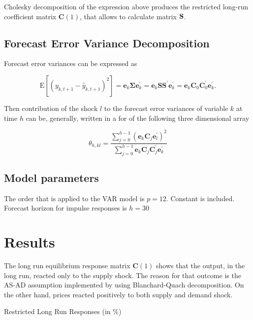 \documentclass[a4paper,12pt]{article}
\begin{document}
Cholesky decomposition of the expression above produces the restricted long-run coefficient matrix \(\mathbf{C}(1)\), that allows to calculate matrix \(\bf S\).

\subsection{Forecast Error Variance Decomposition}

Forecast error variances can be expressed as

\begin{equation} \label{eq:9}
		\mathrm{E}\left[\left(y_{k, t+1}-\hat{y}_{k, t+1}\right)^{2}\right]=\mathbf{e}_{k} \mathbf{\Sigma} \mathbf{e}_{k}^{\prime}=\mathbf{e}_{k} \mathbf{S S}^{\prime} \mathbf{e}_{k}^{\prime}=\mathbf{e}_{k} \mathbf{C}_{0} \mathbf{C}_{0}^{\prime} \mathbf{e}_{k}^{\prime}.
\end{equation}

Then contribution of the shock \(l\) to the forecast error variances of variable \(k\) at time \(h\) can be, generally, written in a for of the following three dimensional array

\begin{equation} \label{eq:10}
		\theta_{h, k l}=\frac{\sum_{j=0}^{h-1}\left(\mathbf{e}_{k} \mathbf{C}_{j} \mathbf{e}_{l}^{\prime}\right)^{2}}{\sum_{j=0}^{h-1} \mathbf{e}_{k} \mathbf{C}_{j} \mathbf{C}_{j}^{\prime} \mathbf{e}_{k}^{\prime}}
\end{equation}

\subsection{Model parameters}

The order that is applied to the VAR model is \(p = 12\). Constant is included. Forecast horizon for impulse responses is \(h=30\)

\section{Results}

The long run equilibrium response matrix \(\mathbf{C}(1)\) shows that the output, in the long run, reacted only to the supply shock. The reason for that outcome is the AS-AD assumption implemented by using Blanchard-Quach decomposition. On the other hand, prices reacted positively to both supply and demand shock.

\begin{table}[h]
\label{table:2}
		\caption{Restricted Long Run Responses (in \%)}
\centering

\end{table}
\end{document}
